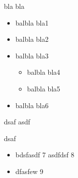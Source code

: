 bla bla 

\begin{itemize}
	\item balbla bla1
	\item balbla bla2
	\item balbla bla3
	\begin{itemize}
		\item balbla bla4
		\item balbla bla5
	\end{itemize}
	\item balbla bla6
\end{itemize}
dsaf
asdf

dsaf

\begin{itemize}
	\item bdsfasdf 7
	asdfdsf 8
	\item dfasfew 9
\end{itemize}